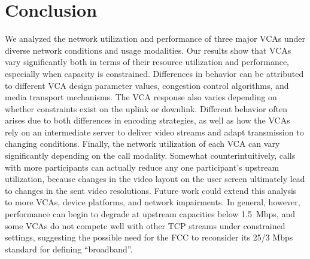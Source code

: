 \section{Conclusion}
\label{sec:conclusion}

We analyzed the network utilization and performance of three major VCAs under
diverse network conditions and usage modalities. Our results show that VCAs
vary significantly both in terms of their resource utilization and
performance, especially when capacity is constrained.  Differences in behavior
can be attributed to different VCA design parameter values, congestion control
algorithms, and media transport mechanisms. The VCA response also varies
depending on whether constraints exist on the uplink or downlink. Different
behavior often arises due to both differences in encoding strategies, as well
as how the VCAs rely on an intermediate server to deliver video streams and
adapt transmission to changing conditions. Finally, the network utilization of
each VCA can vary significantly depending on the call modality. Somewhat
counterintuitively, calls with more participants can actually reduce any one
participant's upstream utilization, because changes in the video layout on the
user screen ultimately lead to changes in the sent video resolutions. Future
work could extend this analysis to more VCAs, device platforms, and network
impairments. In general, however, performance can begin to degrade at upstream
capacities below 1.5~Mbps, and some VCAs do not compete well with other TCP
streams under constrained settings, suggesting the possible need for the FCC
to reconsider its 25/3 Mbps standard for defining ``broadband''.
